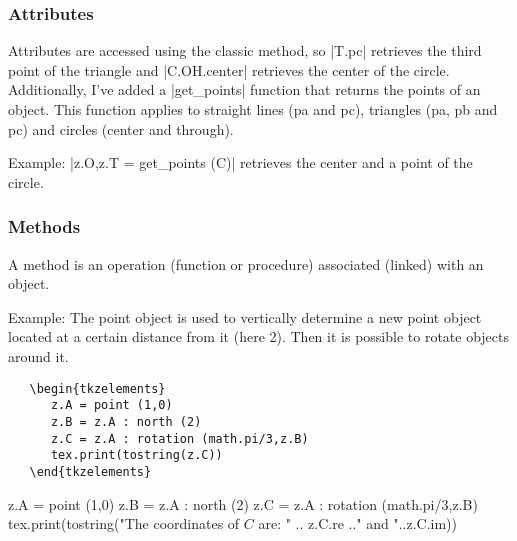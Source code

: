 \vspace{1em}

 \subsubsection{Attributes} %
 \label{ssub:attributes}
 Attributes are accessed using the classic method, so |T.pc| retrieves the third point  of the triangle and |C.OH.center| retrieves the center of the circle.  Additionally, I've added  a |get_points| function that returns the points of an object. This function applies to straight lines (pa and pc), triangles (pa, pb and pc) and circles (center and through).

  \vspace{1em}
  Example: |z.O,z.T = get_points (C)| retrieves the center and a point of the circle.

\subsubsection{Methods} %
\label{ssub:methods}

A method is an operation (function or procedure) associated (linked) with an object.

Example:   The point object is used to vertically determine a new point object located at a certain distance from it (here 2). Then it is possible to rotate objects around it.

\begin{Verbatim}
   \begin{tkzelements}
      z.A = point (1,0)
      z.B = z.A : north (2)             
      z.C = z.A : rotation (math.pi/3,z.B)
      tex.print(tostring(z.C))
   \end{tkzelements}
\end{Verbatim}

\begin{tkzelements}
   z.A = point (1,0)
   z.B = z.A : north (2)
   z.C = z.A : rotation (math.pi/3,z.B)
   tex.print(tostring("The coordinates of $C$ are: " .. z.C.re .." and "..z.C.im))
\end{tkzelements}


\endinput